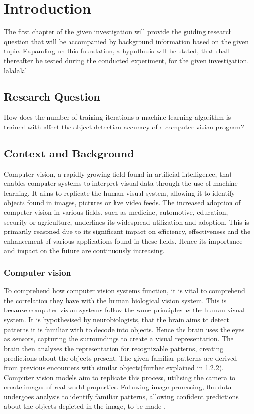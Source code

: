 

\section{Introduction}
The first chapter of the given investigation will provide the guiding research question that will be accompanied by background information based on the given topic. Expanding on this foundation, a hypothesis will be stated, that shall thereafter be tested during the conducted experiment, for the given investigation.  lalalalal

\subsection{Research Question}
How does the number of training iterations a machine learning algorithm is trained with affect the object detection accuracy of a computer vision program?

\subsection{Context and Background}
Computer vision, a rapidly growing field found in artificial intelligence, that enables computer systems to interpret visual data through the use of machine learning. It aims to replicate the human visual system, allowing it to identify objects found in images, pictures or live video feeds. The increased adoption of computer vision in various fields, such as medicine, automotive, education, security or agriculture, underlines its widespread utilization and adoption. This is primarily reasoned due to its significant impact on efficiency, effectiveness and the enhancement of various applications found in these fields. Hence its importance and impact on the future are continuously increasing. 

\subsubsection{Computer vision}
To comprehend how computer vision systems function, it is vital to comprehend the correlation they have with the human biological vision system. This is because computer vision systems follow the same principles as the human visual system. It is hypothesised by neurobiologists, that the brain aims to detect patterns it is familiar with to decode into objects. Hence the brain uses the eyes as sensors, capturing the surroundings to create a visual representation. The brain then analyses the representation for recognizable patterns, creating predictions about the objects present. The given familiar patterns are derived from previous encounters with similar objects(further explained in 1.2.2). Computer vision models aim to replicate this process, utilising the camera to create images of real-world properties. Following image processing, the data undergoes analysis to identify familiar patterns, allowing confident predictions about the objects depicted in the image, to be made \parencite{Hohman2020}.

